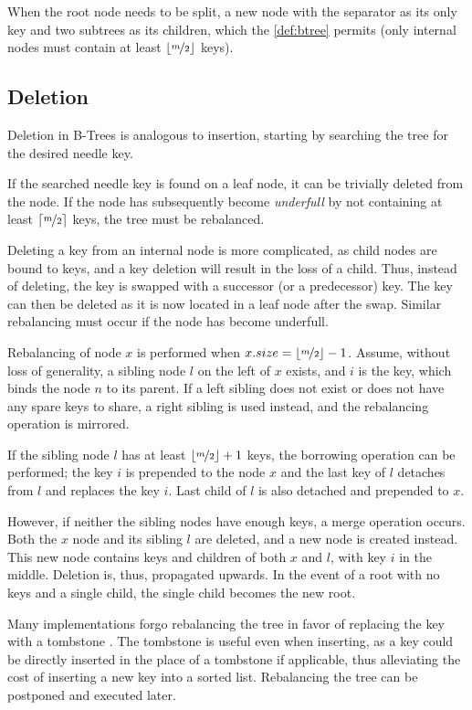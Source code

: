 When the root node needs to be split, a new node with the separator as its only key and two subtrees as its children, which the \cref{def:btree} permits (only internal nodes must contain at least $\lfloor\nicefrac{m}{2}\rfloor$ keys).

\subsection{Deletion}

Deletion in B-Trees is analogous to insertion, starting by searching the tree for the desired needle key.

If the searched needle key is found on a leaf node, it can be trivially deleted from the node. If the node has subsequently become \textit{underfull} by not containing at least $\lceil\nicefrac{m}{2}\rceil$ keys, the tree must be rebalanced.

Deleting a key from an internal node is more complicated, as child nodes are bound to keys, and a key deletion will result in the loss of a child. Thus, instead of deleting, the key is swapped with a successor (or a predecessor) key. The key can then be deleted as it is now located in a leaf node after the swap. Similar rebalancing must occur if the node has become underfull.

Rebalancing of node $x$ is performed when $x.size = \lfloor\nicefrac{m}{2}\rfloor - 1$. Assume, without loss of generality, a sibling node $l$ on the left of $x$ exists, and $i$ is the key, which binds the node $n$ to its parent. If a left sibling does not exist or does not have any spare keys to share, a right sibling is used instead, and the rebalancing operation is mirrored.

If the sibling node $l$ has at least $\lfloor\nicefrac{m}{2}\rfloor + 1$ keys, the borrowing operation can be performed; the key $i$ is prepended to the node $x$ and the last key of $l$ detaches from $l$ and replaces the key $i$. Last child of $l$ is also detached and prepended to $x$.

However, if neither the sibling nodes have enough keys, a merge operation occurs. Both the $x$ node and its sibling $l$ are deleted, and a new node is created instead. This new node contains keys and children of both $x$ and $l$, with key $i$ in the middle. Deletion is, thus, propagated upwards. In the event of a root with no keys and a single child, the single child becomes the new root.

Many implementations forgo rebalancing the tree in favor of replacing the key with a tombstone \cite{goetz-tech}. The tombstone is useful even when inserting, as a key could be directly inserted in the place of a tombstone if applicable, thus alleviating the cost of inserting a new key into a sorted list. Rebalancing the tree can be postponed and executed later.

